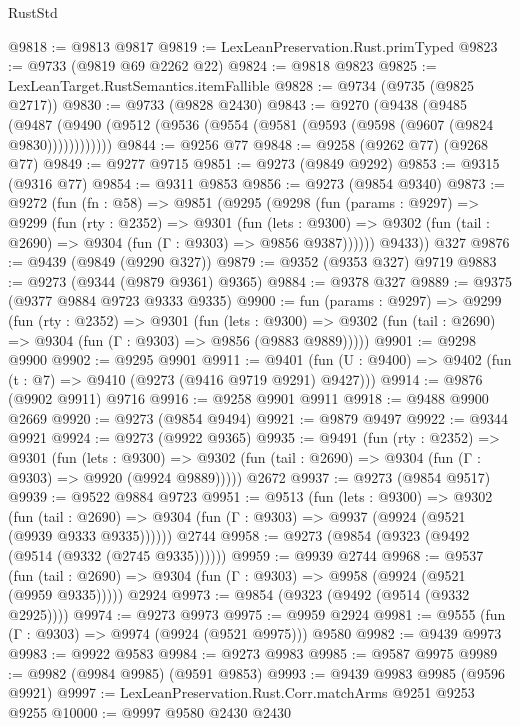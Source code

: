 \begin{lexlean}{RustStd}
\begin{coremodule}
@9818 := @9813 @9817
@9819 := LexLeanPreservation.Rust.primTyped
@9823 := @9733 (@9819 @69 @2262 @22)
@9824 := @9818 @9823
@9825 := LexLeanTarget.RustSemantics.itemFallible
@9828 := @9734 (@9735 (@9825 @2717))
@9830 := @9733 (@9828 @2430)
@9843 := @9270
    (@9438
      (@9485 (@9487 (@9490 (@9512 (@9536 (@9554 (@9581 (@9593 (@9598 (@9607 (@9824 @9830))))))))))))
@9844 := @9256 @77
@9848 := @9258 (@9262 @77) (@9268 @77)
@9849 := @9277 @9715
@9851 := @9273 (@9849 @9292)
@9853 := @9315 (@9316 @77)
@9854 := @9311 @9853
@9856 := @9273 (@9854 @9340)
@9873 := @9272
    (fun (fn : @58) =>
    @9851
      (@9295
        (@9298
          (fun (params : @9297) =>
          @9299
            (fun (rty : @2352) =>
            @9301
              (fun (lets : @9300) =>
              @9302 (fun (tail : @2690) => @9304 (fun (Γ : @9303) => @9856 @9387))))))
        @9433))
    @327
@9876 := @9439 (@9849 (@9290 @327))
@9879 := @9352 (@9353 @327) @9719
@9883 := @9273 (@9344 (@9879 @9361) @9365)
@9884 := @9378 @327
@9889 := @9375 (@9377 @9884 @9723 @9333 @9335)
@9900 := fun (params : @9297) =>
  @9299
    (fun (rty : @2352) =>
    @9301
      (fun (lets : @9300) =>
      @9302 (fun (tail : @2690) => @9304 (fun (Γ : @9303) => @9856 (@9883 @9889)))))
@9901 := @9298 @9900
@9902 := @9295 @9901
@9911 := @9401 (fun (U : @9400) => @9402 (fun (t : @7) => @9410 (@9273 (@9416 @9719 @9291) @9427)))
@9914 := @9876 (@9902 @9911) @9716
@9916 := @9258 @9901 @9911
@9918 := @9488 @9900 @2669
@9920 := @9273 (@9854 @9494)
@9921 := @9879 @9497
@9922 := @9344 @9921
@9924 := @9273 (@9922 @9365)
@9935 := @9491
    (fun (rty : @2352) =>
    @9301
      (fun (lets : @9300) =>
      @9302 (fun (tail : @2690) => @9304 (fun (Γ : @9303) => @9920 (@9924 @9889)))))
    @2672
@9937 := @9273 (@9854 @9517)
@9939 := @9522 @9884 @9723
@9951 := @9513
    (fun (lets : @9300) =>
    @9302
      (fun (tail : @2690) => @9304 (fun (Γ : @9303) => @9937 (@9924 (@9521 (@9939 @9333 @9335))))))
    @2744
@9958 := @9273 (@9854 (@9323 (@9492 (@9514 (@9332 (@2745 @9335))))))
@9959 := @9939 @2744
@9968 := @9537
    (fun (tail : @2690) => @9304 (fun (Γ : @9303) => @9958 (@9924 (@9521 (@9959 @9335)))))
    @2924
@9973 := @9854 (@9323 (@9492 (@9514 (@9332 @2925))))
@9974 := @9273 @9973
@9975 := @9959 @2924
@9981 := @9555 (fun (Γ : @9303) => @9974 (@9924 (@9521 @9975))) @9580
@9982 := @9439 @9973
@9983 := @9922 @9583
@9984 := @9273 @9983
@9985 := @9587 @9975
@9989 := @9982 (@9984 @9985) (@9591 @9853)
@9993 := @9439 @9983 @9985 (@9596 @9921)
@9997 := LexLeanPreservation.Rust.Corr.matchArms @9251 @9253 @9255
@10000 := @9997 @9580 @2430 @2430

\end{coremodule}
\end{lexlean}
